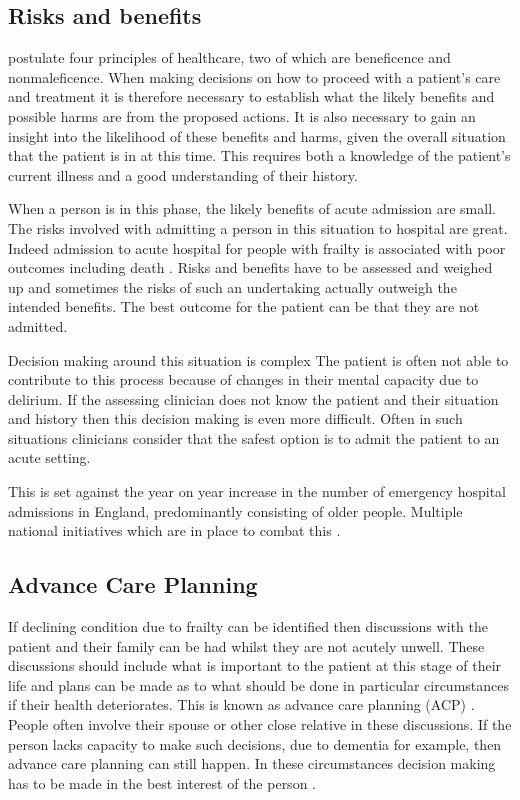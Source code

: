 \documentclass
[
	12pt,
	a4paper,
	oneside,
]{report}
\begin{document}
\subsection{Risks and benefits}
\label{sec:risk-ben}

\textcite{beauchampChildress:01} postulate four principles of healthcare, two
of which are beneficence and nonmaleficence.
When making decisions on how to proceed with a patient's care and treatment
it is therefore necessary to establish what the likely benefits and possible 
harms are from the proposed actions. It is also necessary to gain an insight 
into the likelihood of these benefits and harms, given the overall situation that
the patient is in at this time. This requires both a knowledge of the patient's 
current illness and a good understanding of their history.

When a person is in this phase, the likely benefits of acute admission are small.
The risks involved with admitting a person in this situation
to hospital are great.  
Indeed admission to acute hospital for people with frailty is associated with
poor outcomes including death \parencite{silver:12, wallis:15}. Risks and 
benefits have to be assessed and 
weighed up and sometimes the risks of such an undertaking actually
outweigh the intended benefits. The best outcome for the patient can be that 
they are not admitted. 

Decision making around this situation is complex 
The patient is often not able to contribute to this process because of changes 
in their
mental capacity due to delirium. If the assessing clinician does not know the 
patient and their situation and history then this decision making is even more 
difficult. Often in such situations clinicians consider that the safest option is to 
admit the patient to an acute setting.

This is set against the year on year increase in the number of emergency hospital 
admissions in England, predominantly consisting of older people. Multiple 
national initiatives which are in place to combat this \parencite{nao:18}.

\subsection{Advance Care Planning}

If declining condition due to frailty can be identified then discussions with the 
patient and their family can be had whilst they are not acutely unwell. These 
discussions should include what is important to the patient at this stage of their
life and plans can be made as to what should be done in particular circumstances
if their health deteriorates. This is known as advance care planning
(ACP) \parencite{jennings:18}. People often involve their spouse or other close 
relative in these discussions. If the person lacks capacity to make such
decisions, due to dementia for example, then advance care planning can still
happen. In these circumstances decision making has to be made in the best
interest of the person \parencite{ncpc:11}.
\end{document}
